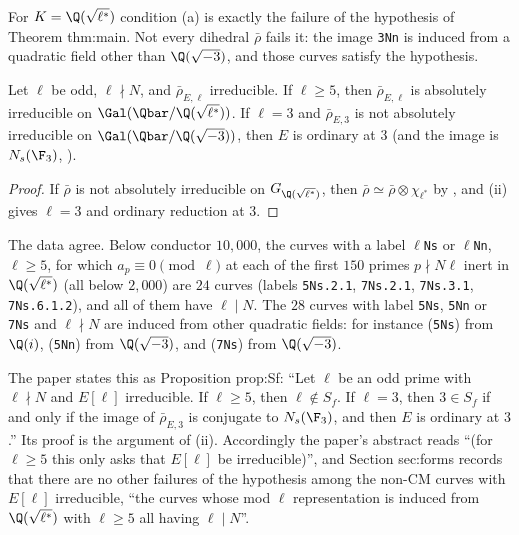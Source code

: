 For $K=\Q(\sqrt{\ell^*})$ condition (a) is exactly the failure of the hypothesis of Theorem thm:main. Not every dihedral $\bar\rho$ fails it: the
image \texttt{3Nn} is induced from a quadratic field other than $\Q(\sqrt{-3})$, and those curves satisfy the hypothesis.

\begin{theorem}\label{thm:galrep:lstar-automatic}
Let $\ell$ be odd, $\ell\nmid N$, and $\bar\rho_{E,\ell}$ irreducible. If $\ell\ge5$, then $\bar\rho_{E,\ell}$ is absolutely irreducible on $\Gal(\Qbar/\Q(\sqrt{\ell^*}))$. If $\ell=3$ and
$\bar\rho_{E,3}$ is not absolutely irreducible on $\Gal(\Qbar/\Q(\sqrt{-3}))$, then $E$ is ordinary at $3$ (and the image is $N_s(\F_3)$, ).
\end{theorem}

\begin{proof}
If $\bar\rho$ is not absolutely irreducible on $G_{\Q(\sqrt{\ell^*})}$, then $\bar\rho\simeq\bar\rho\otimes\chi_{\ell^*}$ by , and (ii)
gives $\ell=3$ and ordinary reduction at $3$.
\end{proof}

The data agree. Below conductor $10{,}000$, the curves with a label \texttt{$\ell$Ns} or \texttt{$\ell$Nn}, $\ell\ge5$, for which $a_p\equiv0\pmod\ell$ at each of the first
$150$ primes $p\nmid N\ell$ inert in $\Q(\sqrt{\ell^*})$ (all below $2{,}000$) are $24$ curves (labels \texttt{5Ns.2.1}, \texttt{7Ns.2.1}, \texttt{7Ns.3.1},
\texttt{7Ns.6.1.2}), and all of them have $\ell\mid N$. The $28$ curves with label \texttt{5Ns}, \texttt{5Nn} or \texttt{7Ns} and $\ell\nmid N$ are induced from
other quadratic fields: for instance  (\texttt{5Ns}) from $\Q(i)$,  (\texttt{5Nn}) from $\Q(\sqrt{-3})$, and 
(\texttt{7Ns}) from $\Q(\sqrt{-3})$.

\begin{paperlink}
The paper states this as Proposition prop:Sf: ``Let $\ell$ be an odd prime with $\ell\nmid N$ and $E[\ell]$ irreducible. If
$\ell\ge5$, then $\ell\notin S_f$. If $\ell=3$, then $3\in S_f$ if and only if the image of $\bar\rho_{E,3}$ is conjugate to $N_s(\F_3)$, and then $E$ is ordinary at
$3$.'' Its proof is the argument of (ii). Accordingly the paper's abstract reads ``(for $\ell\ge5$ this only asks that
$E[\ell]$ be irreducible)'', and Section sec:forms records that there are no other failures of the hypothesis among the non-CM curves with
$E[\ell]$ irreducible, ``the curves whose mod $\ell$ representation is induced from $\Q(\sqrt{\ell^*})$ with $\ell\ge5$ all having $\ell\mid N$''.
\end{paperlink}

